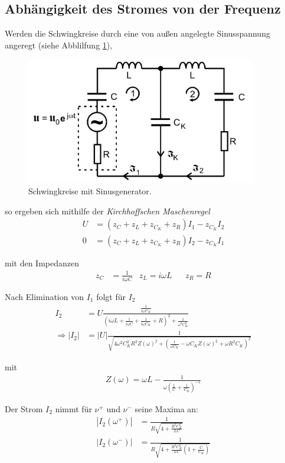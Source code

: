 \subsection {Abhängigkeit des Stromes von der Frequenz}

Werden die Schwingkreise durch eine von außen angelegte Sinusspannung angeregt (siehe Abblilfung \ref{fig:sinusspannung}), \\
\begin{figure} 
    \centering
    \includegraphics[width=10cm] {pictures/sinusspannung.png} 
    \caption{Schwingkreise mit Sinusgenerator. \cite{v355}}
    \label{fig:sinusspannung}
\end{figure} 

so ergeben sich mithilfe der \textit{Kirchhoffschen Maschenregel}
\begin{align}
    U &= (z_{C} + z_{L} + z_{C_{K}} + z_{R}) I_{1} - z_{C_{K}} I_{2} \label{eq:sin_masche_1} \\
    0 &= (z_{C} + z_{L} + z_{C_{K}} + z_{R}) I_{2} - z_{C_{K}} I_{1} \label{eq:sin_masche_2} 
\end{align}

mit den Impedanzen
\begin{align} 
    z_{C} &= \frac{1}{i \omega C} & z_{L} = i \omega L  && z_{R} = R
\end{align}

Nach Elimination von $I_{1}$ folgt für $I_{2}$ 
\begin{align}
    I_{2} &=U \frac{\frac{1}{i \omega C_{K}}}{\left(i \omega L+\frac{1}{i \omega C}+\frac{1}{i \omega C_{K}}+R\right)^{2}+\frac{1}{\omega^{2} C_{K}^{2}}} \label{eq:strom2} \\
    \Rightarrow\left|I_{2}\right| &=\lvert U\rvert \frac{1}{\sqrt{4 \omega^{2} C_{K}^{2} R^{2} Z(\omega)^{2}+\left(\frac{1}{\omega C_{K}}-\omega C_{K} Z(\omega)^{2}+\omega R^{2} C_{K}\right)^{2}}} \label{eq:betrag_strom2}     
\end{align}

mit
\begin{align}
    Z(\omega)=\omega L-\frac{1}{\omega\left(\frac{1}{C}+\frac{1}{C_{K}}\right)^{-1}}
\end{align}

Der Strom $I_{2}$ nimmt für $\nu^+$ und $\nu^-$ seine Maxima an:
\begin{align}
    \left|I_{2}\left(\omega^{+}\right)\right| &= \frac{1}{R \sqrt{4+\frac{R^{2} C_{K}^{2}}{L C}}} \label{eq:strom2_omegaplus}\\
    \left|I_{2}\left(\omega^{-}\right)\right| &= \frac{1}{R \sqrt{4+\frac{R^{2} C_{K}^{2}}{L C}\left(1+\frac{C}{C_{K}}\right)}} \label{eq:strom2_omegaminus}
\end{align}
